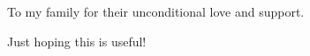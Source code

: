 \newpage
{}

\begin{center}
To my family for their unconditional love and support.
\end{center}

\begin{center}
Just hoping this is useful!
\end{center}

